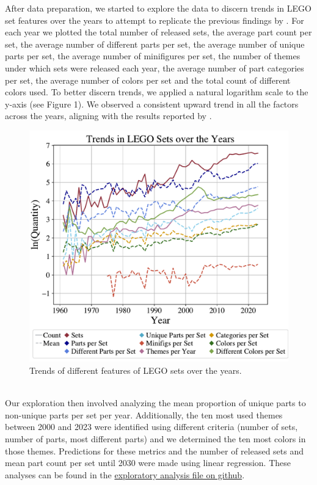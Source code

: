 \documentclass{article}
\theoremstyle{plain}
\theoremstyle{definition}
\theoremstyle{remark}
\begin{document}
	After data preparation, we started to explore the data to discern trends in LEGO set features over the years to attempt to replicate the previous findings by \citet{legocomplexity}. For each year we plotted the total number of released sets, the average part count per set, the average number of different parts per set, the average number of unique parts per set, the average number of minifigures per set, the number of themes under which sets were released each year, the average number of part categories per set, the average number of colors per set and the total count of different colors used. To better discern trends, we applied a natural logarithm scale to the y-axis (see Figure 1). We observed a consistent upward trend in all the factors across the years, aligning with the results reported by \citet{legocomplexity}.\\
	\begin{figure}[ht]
		\vskip 0.2in
		\begin{center}
			\centerline{\includegraphics[width=\columnwidth]{../Images/Exploration.pdf}}
			\caption{Trends of different features of LEGO sets over the years.}
			\label{icml-historical}
		\end{center}
		\vskip -0.2in
	\end{figure}
	\\
	Our exploration then involved analyzing the mean proportion of unique parts to non-unique parts per set per year. Additionally, the ten most used themes between 2000 and 2023 were identified using different criteria (number of sets, number of parts, most different parts) and we determined the ten most colors in those themes. Predictions for these metrics and the number of released sets and mean part count per set until 2030 were made using linear regression. These analyses can be found in the \href{https://github.com/eddiebeach99/Data_Literacy/blob/main/Analysis/exploratory_analysis.ipynb}{exploratory analysis file on github}. \\
\end{document}
